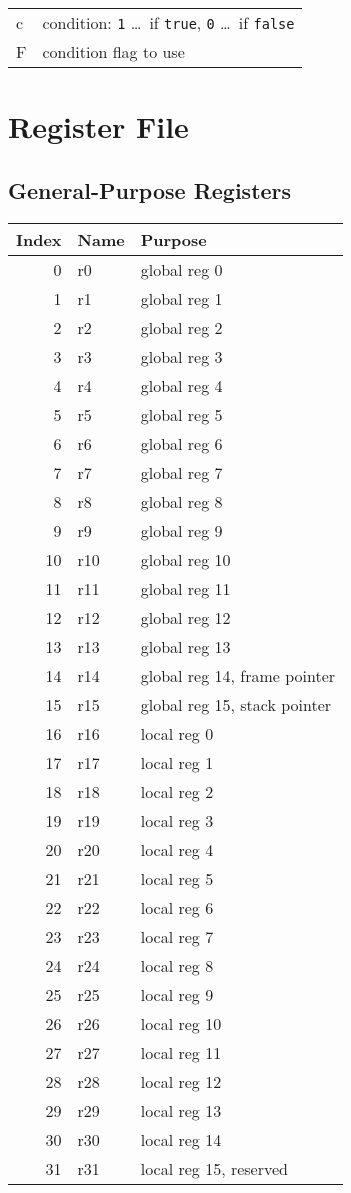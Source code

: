\documentclass[10pt,a4paper]{article}
\begin{document}
\medskip

\noindent
\begin{tabular}{l@{ \ldots\ }l}
  c & condition: \texttt{1} \ldots\ if \texttt{true}, \texttt{0} \ldots\ if \texttt{false} \\
  F & condition flag to use \\
\end{tabular}

\section{Register File}

\subsection{General-Purpose Registers}

\begin{tabular}{rll}
\toprule
Index & Name & Purpose \\
\midrule
0 & r0 & global reg 0 \\
1 & r1 & global reg 1 \\
2 & r2 & global reg 2 \\
3 & r3 & global reg 3 \\
4 & r4 & global reg 4 \\
5 & r5 & global reg 5 \\
6 & r6 & global reg 6 \\
7 & r7 & global reg 7 \\
8 & r8 & global reg 8 \\
9 & r9 & global reg 9 \\
10 & r10 & global reg 10 \\
11 & r11 & global reg 11 \\
12 & r12 & global reg 12 \\
13 & r13 & global reg 13 \\
14 & r14 & global reg 14, frame pointer \\
15 & r15 & global reg 15, stack pointer \\
\cmidrule{1-3}
16 & r16 & local reg 0 \\
17 & r17 & local reg 1 \\
18 & r18 & local reg 2 \\
19 & r19 & local reg 3 \\
20 & r20 & local reg 4 \\
21 & r21 & local reg 5 \\
22 & r22 & local reg 6 \\
23 & r23 & local reg 7 \\
24 & r24 & local reg 8 \\
25 & r25 & local reg 9 \\
26 & r26 & local reg 10 \\
27 & r27 & local reg 11 \\
28 & r28 & local reg 12 \\
29 & r29 & local reg 13 \\
30 & r30 & local reg 14 \\
31 & r31 & local reg 15, reserved \\
\bottomrule 
\end{tabular}
\end{document}
